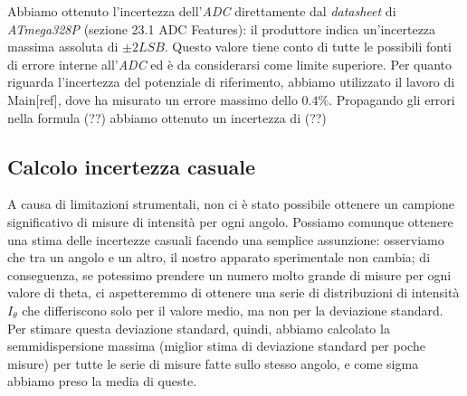 \documentclass[12pt, a4paper, twoside]{article}
\begin{document}
    Abbiamo ottenuto l’incertezza dell’\emph{ADC} direttamente dal
    \emph{datasheet} di \emph{ATmega328P} (sezione 23.1 ADC  Features): %
    il produttore indica un'incertezza massima assoluta di $\pm 2LSB$. %
    Questo valore tiene conto di tutte le possibili fonti di errore interne
    all’\emph{ADC} ed è da considerarsi come limite superiore.
    Per quanto riguarda l'incertezza del potenziale di riferimento, abbiamo
    utilizzato il lavoro di Main[ref], dove ha misurato un errore %
    massimo dello $0.4\%$.
    Propagando gli errori nella formula (??) abbiamo ottenuto un incertezza di %
    (??)

  \subsection{Calcolo incertezza casuale}\label{subsec:calcolo-incertezza-casuale}
    A causa di limitazioni strumentali, non ci è stato possibile ottenere un campione
    significativo di misure di intensità per ogni angolo. Possiamo comunque ottenere
    una stima delle incertezze casuali facendo una semplice assunzione: osserviamo che
    tra un angolo e un altro, il nostro apparato sperimentale non cambia; di conseguenza,
    se potessimo prendere un numero molto grande di misure per ogni valore di theta,
    ci aspetteremmo di ottenere una serie di distribuzioni di intensità $I_\theta$
    che differiscono solo per il valore medio, ma non per la deviazione standard.
    Per stimare questa deviazione standard, quindi, abbiamo calcolato la semmidispersione
    massima (miglior stima di deviazione standard per poche misure) per tutte le serie
    di misure fatte sullo stesso angolo, e come sigma abbiamo preso la media di queste.
\end{document}
